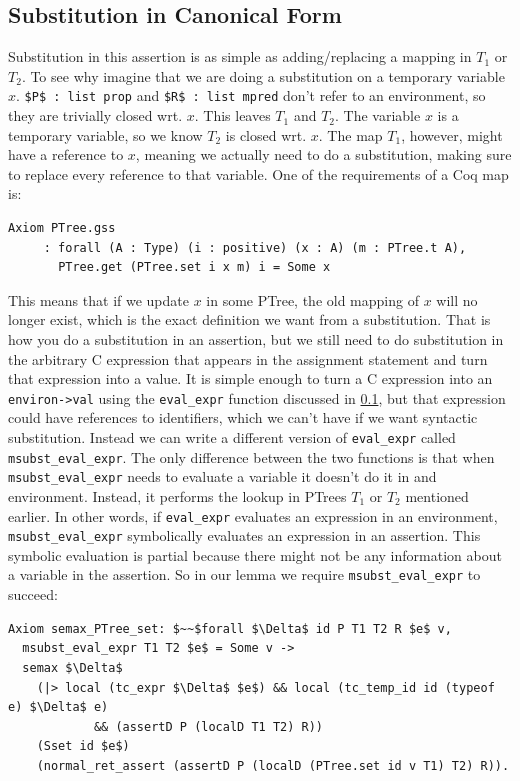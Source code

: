 \documentclass{puthesis}
\begin{document}
\subsection{Substitution in Canonical Form}

Substitution in this assertion is as simple as adding/replacing a
mapping in $T_1$ or $T_2$. To see why imagine that we are doing a
substitution on a temporary variable $x$.  \lstinline|$P$ : list prop|
and \lstinline|$R$ : list mpred| don't refer to an environment, so
they are trivially closed wrt.  $x$. This leaves $T_1$ and $T_2$. The
variable $x$ is a temporary variable, so we know $T_2$ is closed
wrt. $x$.  The map $T_1$, however, might have a reference to $x$,
meaning we actually need to do a substitution, making sure to replace
every reference to that variable. One of the requirements of a Coq map
is:

\begin{verbatim}
Axiom PTree.gss
     : forall (A : Type) (i : positive) (x : A) (m : PTree.t A),
       PTree.get (PTree.set i x m) i = Some x
\end{verbatim}

This means that if we update $x$ in some PTree, the old mapping of $x$
will no longer exist, which is the exact definition we want from a
substitution. That is how you do a substitution in an assertion, but
we still need to do substitution in the arbitrary C expression that
appears in the assignment statement and turn that expression into a
value. It is simple enough to turn a C expression into an
\lstinline|environ->val| using the \lstinline|eval_expr| function
discussed in \ref{}, but that expression could have references to
identifiers, which we can't have if we want syntactic
substitution. Instead we can write a different version of
\lstinline|eval_expr| called \lstinline|msubst_eval_expr|. The only
difference between the two functions is that when
\lstinline|msubst_eval_expr| needs to evaluate a variable it doesn't
do it in and environment. Instead, it performs the lookup in PTrees
$T_1$ or $T_2$ mentioned earlier. In other words, if
\lstinline|eval_expr| evaluates an expression in an environment,
\lstinline|msubst_eval_expr| symbolically evaluates an expression in
an assertion. This symbolic evaluation is partial because there might
not be any information about a variable in the assertion. So in our
lemma we require \lstinline|msubst_eval_expr| to succeed:

\begin{lstlisting}
Axiom semax_PTree_set: $~~$forall $\Delta$ id P T1 T2 R $e$ v,
  msubst_eval_expr T1 T2 $e$ = Some v ->
  semax $\Delta$
    (|> local (tc_expr $\Delta$ $e$) && local (tc_temp_id id (typeof e) $\Delta$ e) 
            && (assertD P (localD T1 T2) R))
    (Sset id $e$)
    (normal_ret_assert (assertD P (localD (PTree.set id v T1) T2) R)).
\end{lstlisting}
\end{document}
